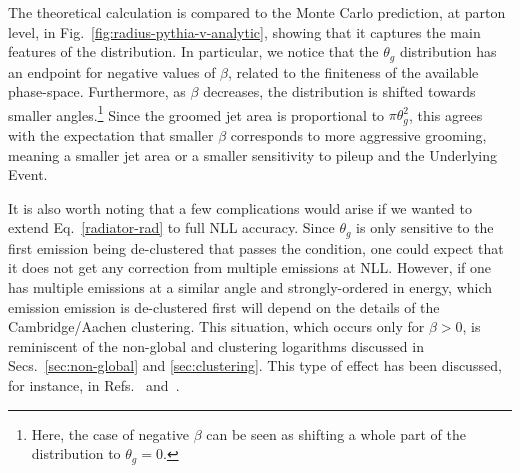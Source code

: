 The theoretical calculation is compared to the Monte Carlo prediction,
at parton level, in Fig.~\ref{fig:radius-pythia-v-analytic}, showing
that it captures the main features of the distribution.
%
In particular, we notice that the $\theta_g$ distribution has an
endpoint for negative values of $\beta$, related to the finiteness of
the available phase-space.
%
Furthermore, as $\beta$ decreases, the distribution is shifted towards
smaller angles.\footnote{Here, the case of negative $\beta$ can be seen
  as shifting a whole part of the distribution to
  $\theta_g=0$.} Since the groomed jet area is proportional to
$\pi\theta_g^2$, this agrees with the expectation that smaller $\beta$
corresponds to more aggressive grooming, meaning a smaller jet area or
a smaller sensitivity to pileup and the Underlying Event.


It is
also worth noting that a few complications would arise if we wanted to
extend Eq.~\eqref{radiator-rad} to full NLL accuracy.
% 
Since $\theta_g$ is only sensitive to the first emission being
de-clustered that passes the \SD condition, one could expect that it
does not get any correction from multiple emissions at NLL.
%
However, if one has multiple emissions at a similar angle and
strongly-ordered in energy, which emission emission is de-clustered
first will depend on the details of the Cambridge/Aachen
clustering. This situation, which occurs only for $\beta>0$, is
reminiscent of the non-global and clustering logarithms discussed in
Secs.~\ref{sec:non-global} and \ref{sec:clustering}.
%
This type of effect has been discussed, for instance, in
Refs.~\cite{Neill:2018yet} and~\cite{Dreyer:2018nbf}.

